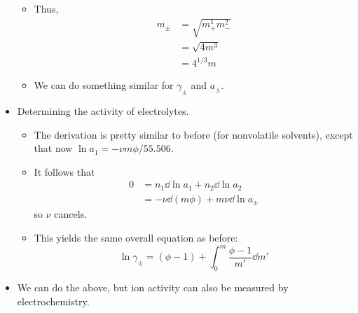 \documentclass[../notes.tex]{subfiles}
\begin{document}
\begin{itemize}
\begin{itemize}
        \item Thus,
        \begin{align*}
            m_\pm &= \sqrt{m_+^1m_-^2}\\
            &= \sqrt{4m^3}\\
            &= 4^{1/3}m
        \end{align*}
        \item We can do something similar for $\gamma_\pm$ and $a_\pm$.
    \end{itemize}
    \item Determining the activity of electrolytes.
    \begin{itemize}
        \item The derivation is pretty similar to before (for nonvolatile solvents), except that now $\ln a_1=-\nu m\phi/55.506$.
        \item It follows that
        \begin{align*}
            0 &= n_1\dd{\ln a_1}+n_2\dd{\ln a_2}\\
            &= -\nu\dd{(m\phi)}+m\nu\dd{\ln a_\pm}
        \end{align*}
        so $\nu$ cancels.
        \item This yields the same overall equation as before:
        \begin{equation*}
            \ln\gamma_\pm = (\phi-1)+\int_0^m\frac{\phi-1}{m'}\dd{m'}
        \end{equation*}
    \end{itemize}
    \item We can do the above, but ion activity can also be measured by electrochemistry.
\end{itemize}
\end{document}
